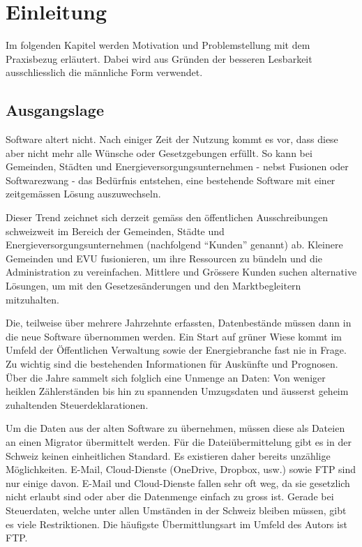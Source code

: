 \chapter{Einleitung}
Im folgenden Kapitel werden Motivation und Problemstellung mit dem Praxisbezug erläutert. 
Dabei wird aus Gründen der besseren Lesbarkeit ausschliesslich 
die männliche Form verwendet.

\section{Ausgangslage}
Software altert nicht. Nach einiger Zeit der Nutzung kommt es vor, dass diese aber nicht mehr alle Wünsche oder Gesetzgebungen erfüllt.
So kann bei Gemeinden, Städten und Energieversorgungsunternehmen - nebst Fusionen oder Softwarezwang - das Bedürfnis entstehen, 
eine bestehende Software mit einer zeitgemässen Lösung auszuwechseln.   

Dieser Trend zeichnet sich derzeit gemäss den öffentlichen Ausschreibungen schweizweit im Bereich der Gemeinden, Städte und Energieversorgungsunternehmen 
(nachfolgend ``Kunden'' genannt) ab. 
Kleinere Gemeinden und EVU fusionieren, um ihre Ressourcen zu bündeln und die Administration zu vereinfachen. 
Mittlere und Grössere Kunden suchen alternative Lösungen, um mit den Gesetzesänderungen und den Marktbegleitern mitzuhalten.  

Die, teilweise über mehrere Jahrzehnte erfassten, Datenbestände müssen dann in die neue Software übernommen werden. 
Ein Start auf grüner Wiese kommt im Umfeld der Öffentlichen Verwaltung sowie der Energiebranche fast nie in Frage. 
Zu wichtig sind die bestehenden Informationen für Auskünfte und Prognosen. 
Über die Jahre sammelt sich folglich eine Unmenge an Daten: 
Von weniger heiklen Zählerständen bis hin zu spannenden Umzugsdaten und äusserst geheim zuhaltenden Steuerdeklarationen. 

Um die Daten aus der alten Software zu übernehmen, müssen diese als Dateien an einen Migrator übermittelt werden. 
Für die Dateiübermittelung gibt es in der Schweiz keinen einheitlichen Standard. 
Es existieren daher bereits unzählige Möglichkeiten. E-Mail, Cloud-Dienste (OneDrive, Dropbox, usw.) sowie FTP sind nur 
einige davon. E-Mail und Cloud-Dienste fallen sehr oft weg, da sie gesetzlich nicht erlaubt sind oder aber die Datenmenge einfach zu gross ist. 
Gerade bei Steuerdaten, welche unter allen Umständen in der Schweiz bleiben müssen, gibt es viele Restriktionen.
Die häufigste Übermittlungsart im Umfeld des Autors ist FTP. 

